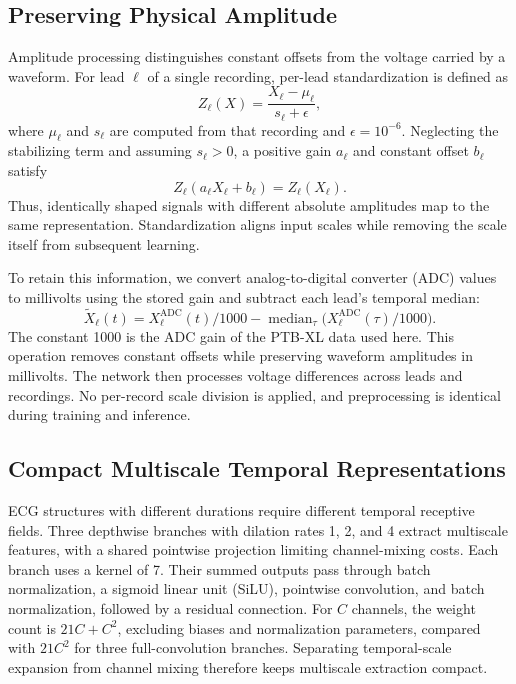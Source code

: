 \documentclass[11pt,a4paper]{article}
\begin{document}
\subsection{Preserving Physical Amplitude}
Amplitude processing distinguishes constant offsets from the voltage carried by a waveform. For lead $\ell$ of a single recording, per-lead standardization is defined as
\begin{equation}
 Z_\ell(X)=\frac{X_\ell-\mu_\ell}{s_\ell+\epsilon},
\end{equation}
where $\mu_\ell$ and $s_\ell$ are computed from that recording and $\epsilon=10^{-6}$. Neglecting the stabilizing term and assuming $s_\ell>0$, a positive gain $a_\ell$ and constant offset $b_\ell$ satisfy
\begin{equation}
 Z_\ell(a_\ell X_\ell+b_\ell)=Z_\ell(X_\ell).
\end{equation}
Thus, identically shaped signals with different absolute amplitudes map to the same representation. Standardization aligns input scales while removing the scale itself from subsequent learning.

To retain this information, we convert analog-to-digital converter (ADC) values to millivolts using the stored gain and subtract each lead's temporal median:
\begin{equation}
 \widetilde X_\ell(t)=X^{\mathrm{ADC}}_\ell(t)/1000
 -\operatorname{median}_{\tau}\big(X^{\mathrm{ADC}}_\ell(\tau)/1000\big).
\end{equation}
The constant 1000 is the ADC gain of the PTB-XL data used here. This operation removes constant offsets while preserving waveform amplitudes in millivolts. The network then processes voltage differences across leads and recordings. No per-record scale division is applied, and preprocessing is identical during training and inference.

\subsection{Compact Multiscale Temporal Representations}
ECG structures with different durations require different temporal receptive fields. Three depthwise branches with dilation rates 1, 2, and 4 extract multiscale features, with a shared pointwise projection limiting channel-mixing costs\cite{howard2017}. Each branch uses a kernel of 7. Their summed outputs pass through batch normalization, a sigmoid linear unit (SiLU), pointwise convolution, and batch normalization, followed by a residual connection. For $C$ channels, the weight count is $21C+C^2$, excluding biases and normalization parameters, compared with $21C^2$ for three full-convolution branches. Separating temporal-scale expansion from channel mixing therefore keeps multiscale extraction compact.
\end{document}
